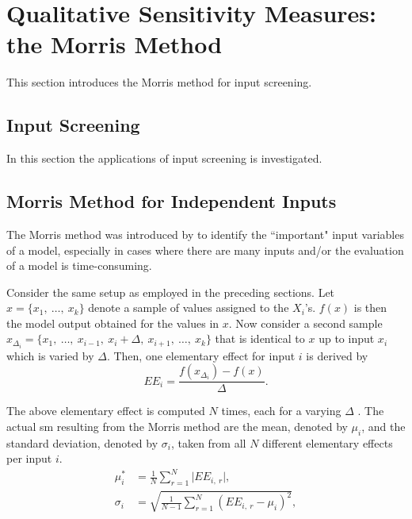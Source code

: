 \section{Qualitative Sensitivity Measures: the Morris Method} \label{comp_morris}

This section introduces the Morris method for input screening.

\subsection{Input Screening}

In this section the applications of input screening is investigated.

% 

\subsection{Morris Method for Independent Inputs} \label{classic_morris}

The Morris method was introduced by \citet{M91} to identify the ``important" input variables of a model, especially in cases where there are many inputs and/or the evaluation of a model is time-consuming.

Consider the same setup as employed in the preceding sections. Let $x = \{x_1,\ \dots,\ x_k\}$ denote a sample of values assigned to the $X_i$'s. $f(x)$ is then the model output obtained for the values in $x$. Now consider a second sample $x_{\Delta_i} = \{x_1,\ \dots,\ x_{i-1},\ x_i + \Delta,\ x_{i+1},\ \dots,\ x_k\}$ that is identical to $x$ up to input $x_i$ which is varied by $\Delta$. Then, one elementary effect for input $i$ is derived by
\begin{equation}
EE_i = \frac{f(x_{\Delta_i}) - f(x)}{\Delta}.
\end{equation}

The above elementary effect is computed $N$ times, each for a varying $\Delta$ \citep{GM17}. The actual sm resulting from the Morris method are the mean, denoted by $\mu_i$, and the standard deviation, denoted by $\sigma_i$, taken from all $N$ different elementary effects per input $i$.
\begin{align}
\mu_i^\ast& = \frac{1}{N} \sum_{r=1}^N \vert EE_{i,\ r} \vert, \label{mu}\\
\sigma_i& = \sqrt{\frac{1}{N-1} \sum_{r=1}^N (EE_{i,\ r} - \mu_i)^2}, \label{sigma}
\end{align}

